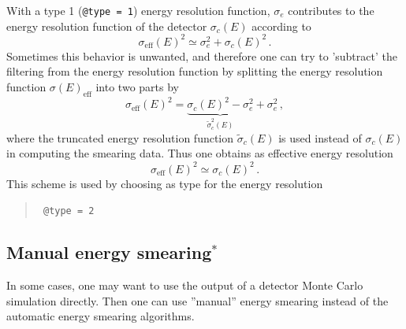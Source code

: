 With a type 1 ({\tt @type = 1}) energy resolution 
function, $\sigma_e$ contributes to the energy resolution function 
of the detector $\sigma_c(E)$ according to
\begin{equation}
\sigma_{\mathrm{eff}}(E)^2\simeq \sigma_e^2 + \sigma_c(E)^2\,.
\end{equation} 
Sometimes this behavior is unwanted, and therefore one can try to 
'subtract' the filtering from the energy resolution function by splitting 
the energy resolution function $\sigma(E)_{\mathrm{eff}}$ into
two parts by
\begin{equation}
\sigma_{\mathrm{eff}}(E)^2=\underbrace{\sigma_c(E)^2-\sigma_e^2}_
{\tilde\sigma^2_c(E)}+\sigma_e^2\,,
\end{equation}
where the truncated energy resolution function $\tilde\sigma_c(E)$ 
is used instead of $\sigma_c(E)$ in computing the
smearing data. Thus one obtains as effective energy resolution
\begin{equation}
\sigma_{\mathrm{eff}}(E)^2\simeq \sigma_c(E)^2\,.
\end{equation} 
This scheme is used by choosing as type for the energy resolution
\begin{quote}
{\tt
@type = 2
}
\end{quote}

\subsection{Manual energy smearing$^*$}

In some cases, one may want to use the output of a detector Monte Carlo simulation
directly. Then one can use ''manual'' energy smearing instead  of the
automatic energy smearing algorithms. 

